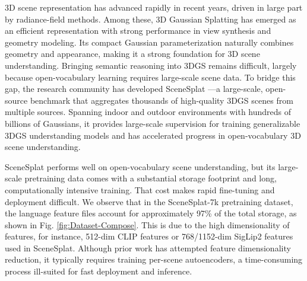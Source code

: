 \documentclass[10pt,twocolumn,letterpaper]{article}
\begin{document}
3D scene representation has advanced rapidly in recent years, driven in large part by radiance-field methods. Among these, 3D Gaussian Splatting \cite{kerbl3Dgaussians} has emerged as an efficient representation with strong performance in view synthesis and geometry modeling. Its compact Gaussian parameterization naturally combines geometry and appearance, making it a strong foundation for 3D scene understanding.
Bringing semantic reasoning into 3DGS remains difficult, largely because open-vocabulary learning requires large-scale scene data. To bridge this gap, the research community has developed SceneSplat \cite{li2025scenesplat,ma2025scenesplatpp}---a large-scale, open-source benchmark that aggregates thousands of high-quality 3DGS scenes from multiple sources. Spanning indoor and outdoor environments with hundreds of billions of Gaussians, it provides large-scale supervision for training generalizable 3DGS understanding models and has accelerated progress in open-vocabulary 3D scene understanding.

SceneSplat performs well on open-vocabulary scene understanding, but its large-scale pretraining data comes with a substantial storage footprint and long, computationally intensive training. That cost makes rapid fine-tuning and deployment difficult. We observe that in the SceneSplat-7k pretraining dataset, the language feature files account for approximately 97\% of the total storage, as shown in Fig. \ref{fig:Dataset-Compose}. This is due to the high dimensionality of features, for instance, 512-dim CLIP \cite{big_vision} features or 768/1152-dim SigLip2 \cite{tschannen2025siglip} features used in SceneSplat. Although prior work has attempted feature dimensionality reduction, it typically requires training per-scene autoencoders, a time-consuming process ill-suited for fast deployment and inference.
\end{document}
